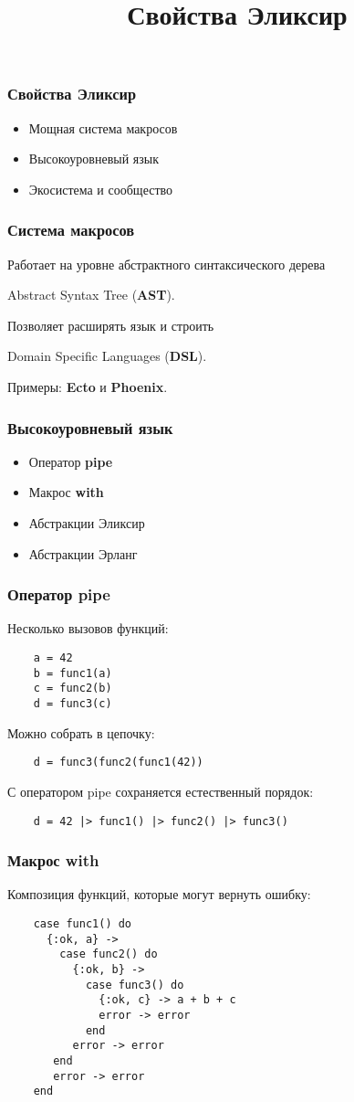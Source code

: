 \documentclass[10pt]{beamer}
\title{Свойства Эликсир}
\begin{document}
\begin{frame}
  \frametitle{Свойства Эликсир}
  \begin{itemize}
  \item Мощная система макросов
  \item Высокоуровневый язык
  \item Экосистема и сообщество
  \end{itemize}
\end{frame}

\begin{frame}
  \frametitle{Система макросов}
  Работает на уровне абстрактного синтаксического дерева
  \par
  Abstract Syntax Tree (\textbf{AST}).
  \par \bigskip
  Позволяет расширять язык и строить
  \par
  Domain Specific Languages (\textbf{DSL}).
  \par \bigskip
  Примеры: \textbf{Ecto} и \textbf{Phoenix}.
\end{frame}

\begin{frame}
  \frametitle{Высокоуровневый язык}
  \begin{itemize}
  \item Оператор \textbf{pipe}
  \item Макрос \textbf{with}
  \item Абстракции Эликсир
  \item Абстракции Эрланг
  \end{itemize}
\end{frame}


\begin{frame}[fragile]
  \frametitle{Оператор pipe}
  Несколько вызовов функций:
  \begin{lstlisting}
    a = 42
    b = func1(a)
    c = func2(b)
    d = func3(c)
  \end{lstlisting}
  Можно собрать в цепочку:
  \begin{lstlisting}
    d = func3(func2(func1(42))
  \end{lstlisting}
  С оператором pipe сохраняется естественный порядок:
  \begin{lstlisting}
    d = 42 |> func1() |> func2() |> func3()
  \end{lstlisting}
\end{frame}

\begin{frame}[fragile]
  \frametitle{Макрос with}
  Композиция функций, которые могут вернуть ошибку:
  \begin{lstlisting}
    case func1() do
      {:ok, a} ->
        case func2() do
          {:ok, b} ->
            case func3() do
              {:ok, c} -> a + b + c
              error -> error
            end
          error -> error
       end
       error -> error
    end
  \end{lstlisting}
\end{frame}
\end{document}
